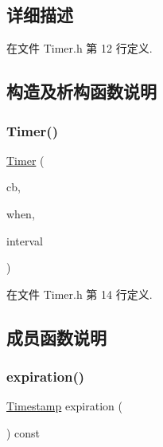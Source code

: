 \subsection{详细描述}


在文件 Timer.\+h 第 12 行定义.



\subsection{构造及析构函数说明}
\mbox{\label{classmuduo_1_1Timer_a302c3f4c56839e86ec39f308d167fcb9}} 
\subsubsection{\texorpdfstring{Timer()}{Timer()}}
{\footnotesize\ttfamily \hyperlink{classmuduo_1_1Timer}{Timer} (\begin{DoxyParamCaption}\item[{const \hyperlink{namespacemuduo_a5f7453c2a15825e79bddf5deaec707bf}{Timer\+Callback} \&}]{cb,  }\item[{\hyperlink{classmuduo_1_1Timestamp}{Timestamp}}]{when,  }\item[{double}]{interval }\end{DoxyParamCaption})\hspace{0.3cm}{\ttfamily [inline]}}



在文件 Timer.\+h 第 14 行定义.



\subsection{成员函数说明}
\mbox{\label{classmuduo_1_1Timer_afa0ac5aa813b96802d509cf972054108}} 
\subsubsection{\texorpdfstring{expiration()}{expiration()}}
{\footnotesize\ttfamily \hyperlink{classmuduo_1_1Timestamp}{Timestamp} expiration (\begin{DoxyParamCaption}{ }\end{DoxyParamCaption}) const\hspace{0.3cm}{\ttfamily [inline]}}



